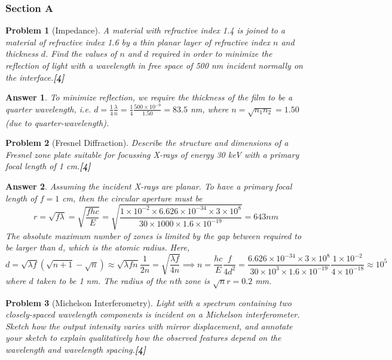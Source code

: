 \documentclass[a4paper]{article}
\newtheorem{ans}{Answer}[subsection]
\theoremstyle{new}
\newtheorem{qns}{Problem}[subsection]
\begin{document}
\subsubsection{Section A}
\begin{qns}[Impedance]
A material with refractive index 1.4 is joined to a material of refractive index 1.6 by a thin planar layer of refractive index $n$ and thickness $d$. Find the values of $n$ and $d$ required in order to minimize the reflection of light with a wavelength in free space of 500 nm incident normally on the interface.\hfill\textbf{[4]} 
\begin{mdframed}
\color{darkblue}{You are not expected to derive a general expression for the reflection coefficient.}
\end{mdframed}
\end{qns}
\begin{ans}
To minimize reflection, we require the thickness of the film to be a quarter wavelength, i.e. $d=\frac{1}{4}\frac{\lambda}{n}=\frac{1}{4}\frac{500\times10^{-9}}{1.50}=83.5$ nm, where $n=\sqrt{n_1n_2}=1.50$ (due to quarter-wavelength).
\end{ans}
\begin{qns}[Fresnel Diffraction]
Describe the structure and dimensions of a Fresnel zone plate suitable for focussing X-rays of energy 30 keV with a primary focal length of 1 cm.\hfill\textbf{[4]}
\end{qns}
\begin{ans}
Assuming the incident X-rays are planar. To have a primary focal length of $f=1$ cm, then the circular aperture must be
$$r=\sqrt{f\lambda}=\sqrt{\frac{fhc}{E}}=\sqrt{\frac{1\times10^{-2}\times6.626\times10^{-34}\times 3\times10^8}{30\times1000\times 1.6\times10^{-19}}}=643 nm$$
The absolute maximum number of zones is limited by the gap between required to be larger than $d$, which is the atomic radius. Here, 
$$d=\sqrt{\lambda f}(\sqrt{n+1}-\sqrt{n})\approx\sqrt{\lambda fn}\frac{1}{2n}=\sqrt{\frac{\lambda f}{4n}}\implies n=\frac{hc}{E}\frac{f}{4d^2}=\frac{6.626\times10^{-34}\times 3\times10^8}{30\times10^3\times 1.6\times10^{-19}}\frac{1\times10^{-2}}{4\times10^{-18}}\approx 10^5$$
where $d$ taken to be 1 nm. The radius of the $n$th zone is $\sqrt{n}r=0.2$ mm.
\end{ans}
\begin{qns}[Michelson Interferometry]
Light with a spectrum containing two closely-spaced wavelength components is incident on a Michelson interferometer. Sketch how the output intensity varies with mirror displacement, and annotate your sketch to explain qualitatively how the observed features depend on the wavelength and wavelength spacing.\hfill\textbf{[4]}
\end{qns}
\end{document}
